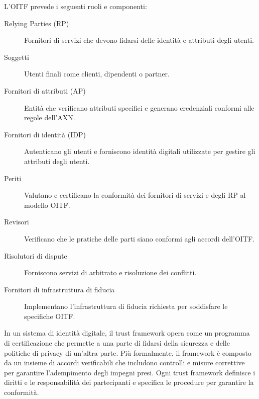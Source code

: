 L'OITF prevede i seguenti ruoli e componenti:

\begin{description}
    \item[Relying Parties (RP)] Fornitori di servizi che devono fidarsi delle identità e attributi degli utenti.
    \item[Soggetti] Utenti finali come clienti, dipendenti o partner.
    \item[Fornitori di attributi (AP)] Entità che verificano attributi specifici e generano credenziali conformi alle regole dell'AXN.
    \item[Fornitori di identità (IDP)] Autenticano gli utenti e forniscono identità digitali utilizzate per gestire gli attributi degli utenti.
    \item[Periti] Valutano e certificano la conformità dei fornitori di servizi e degli RP al modello OITF.
    \item[Revisori] Verificano che le pratiche delle parti siano conformi agli accordi dell'OITF.
    \item[Risolutori di dispute] Forniscono servizi di arbitrato e risoluzione dei conflitti.
    \item[Fornitori di infrastruttura di fiducia] Implementano l'infrastruttura di fiducia richiesta per soddisfare le specifiche OITF.
\end{description}

In un sistema di identità digitale, il trust framework opera come un programma di certificazione che permette a una parte di fidarsi della sicurezza e delle politiche di privacy di un'altra parte. Più formalmente, il framework è composto da un insieme di accordi verificabili che includono controlli e misure correttive per garantire l'adempimento degli impegni presi. Ogni trust framework definisce i diritti e le responsabilità dei partecipanti e specifica le procedure per garantire la conformità.